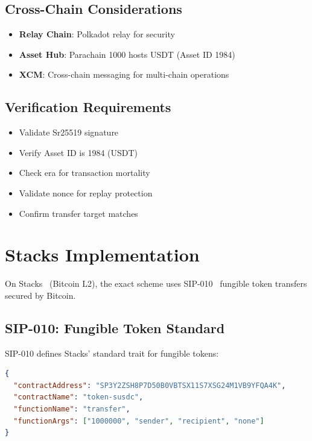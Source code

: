 \subsection{Cross-Chain Considerations}

\begin{itemize}
    \item \textbf{Relay Chain}: Polkadot relay for security
    \item \textbf{Asset Hub}: Parachain 1000 hosts USDT (Asset ID 1984)
    \item \textbf{XCM}: Cross-chain messaging for multi-chain operations
\end{itemize}

\subsection{Verification Requirements}

\begin{itemize}
    \item Validate Sr25519 signature
    \item Verify Asset ID is 1984 (USDT)
    \item Check era for transaction mortality
    \item Validate nonce for replay protection
    \item Confirm transfer target matches 
\end{itemize}

\section{Stacks Implementation}
\label{sec:stacks-implementation}

On Stacks~\cite{stacks} (Bitcoin L2), the exact scheme uses SIP-010~\cite{sip010} fungible token transfers secured by Bitcoin.

\subsection{SIP-010: Fungible Token Standard}

SIP-010 defines Stacks' standard trait for fungible tokens:

\begin{lstlisting}[language=json,caption={SIP-010 transfer call}]
{
  "contractAddress": "SP3Y2ZSH8P7D50B0VBTSX11S7XSG24M1VB9YFQA4K",
  "contractName": "token-susdc",
  "functionName": "transfer",
  "functionArgs": ["1000000", "sender", "recipient", "none"]
}
\end{lstlisting}


